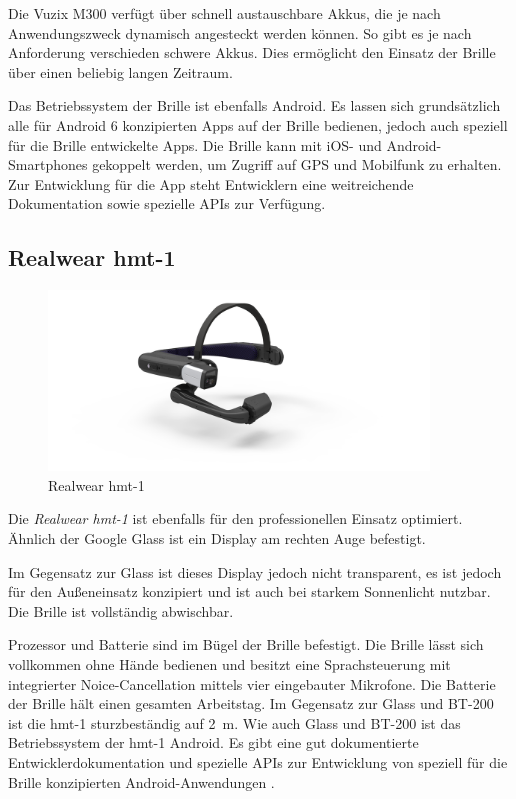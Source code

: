 Die Vuzix M300 verfügt über schnell austauschbare Akkus, die je nach Anwendungszweck dynamisch angesteckt werden können. So gibt es je nach Anforderung verschieden schwere Akkus. Dies ermöglicht den Einsatz der Brille über einen beliebig langen Zeitraum.

Das Betriebssystem der Brille ist ebenfalls Android. Es lassen sich grundsätzlich alle für Android 6 konzipierten Apps auf der Brille bedienen, jedoch auch speziell für die Brille entwickelte Apps. Die Brille kann mit iOS- und Android-Smartphones gekoppelt werden, um Zugriff auf GPS und Mobilfunk zu erhalten. Zur Entwicklung für die App steht Entwicklern eine weitreichende Dokumentation sowie spezielle APIs zur Verfügung. \cite{Vuzix2018}
%
%
%
%
%
%
\subsection{Realwear hmt-1}
\label{sec:Realwear_hmt-1}
%
\begin{figure}[htbp]
    \centering
    \includegraphics[width=0.9\textwidth]{data/bilder/HMT_1.jpg}
    \caption{Realwear hmt-1 \cite{Wire2017}}
    \label{fig:hmt1}
\end{figure}
%

Die \emph{Realwear hmt-1} ist ebenfalls für den professionellen Einsatz optimiert. Ähnlich der Google Glass ist ein Display am rechten Auge befestigt. 

Im Gegensatz zur Glass ist dieses Display jedoch nicht transparent, es ist jedoch für den Außeneinsatz konzipiert und ist auch bei starkem Sonnenlicht nutzbar. Die Brille ist vollständig abwischbar.

Prozessor und Batterie sind im Bügel der Brille befestigt. Die Brille lässt sich vollkommen ohne Hände bedienen und besitzt eine Sprachsteuerung mit integrierter Noice-Cancellation mittels vier eingebauter Mikrofone. Die Batterie der Brille hält einen gesamten Arbeitstag. Im Gegensatz zur Glass und BT-200 ist die hmt-1 sturzbeständig auf 2~m. Wie auch Glass und BT-200 ist das Betriebssystem der hmt-1 Android. Es gibt eine gut dokumentierte Entwicklerdokumentation und spezielle APIs zur Entwicklung von speziell für die Brille konzipierten Android-Anwendungen \cite{Realwear2018}.